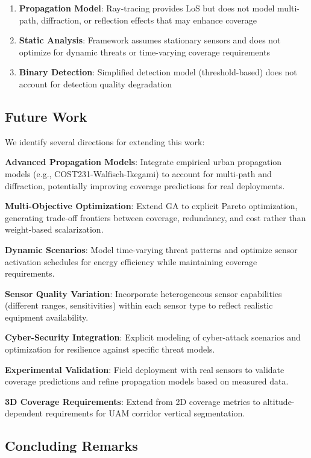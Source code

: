 \begin{enumerate}
\item \textbf{Propagation Model}: Ray-tracing provides LoS but does not model multi-path, diffraction, or reflection effects that may enhance coverage
\item \textbf{Static Analysis}: Framework assumes stationary sensors and does not optimize for dynamic threats or time-varying coverage requirements
\item \textbf{Binary Detection}: Simplified detection model (threshold-based) does not account for detection quality degradation
\end{enumerate}

\subsection{Future Work}

We identify several directions for extending this work:

\textbf{Advanced Propagation Models}: Integrate empirical urban propagation models (e.g., COST231-Walfisch-Ikegami) to account for multi-path and diffraction, potentially improving coverage predictions for real deployments.

\textbf{Multi-Objective Optimization}: Extend GA to explicit Pareto optimization, generating trade-off frontiers between coverage, redundancy, and cost rather than weight-based scalarization.

\textbf{Dynamic Scenarios}: Model time-varying threat patterns and optimize sensor activation schedules for energy efficiency while maintaining coverage requirements.

\textbf{Sensor Quality Variation}: Incorporate heterogeneous sensor capabilities (different ranges, sensitivities) within each sensor type to reflect realistic equipment availability.

\textbf{Cyber-Security Integration}: Explicit modeling of cyber-attack scenarios and optimization for resilience against specific threat models.

\textbf{Experimental Validation}: Field deployment with real sensors to validate coverage predictions and refine propagation models based on measured data.

\textbf{3D Coverage Requirements}: Extend from 2D coverage metrics to altitude-dependent requirements for UAM corridor vertical segmentation.

\subsection{Concluding Remarks}

